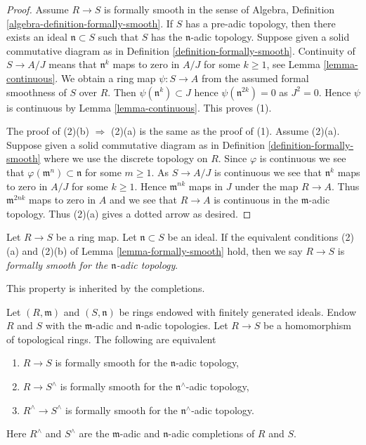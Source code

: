 \begin{proof}
Assume $R \to S$ is formally smooth in
the sense of Algebra, Definition \ref{algebra-definition-formally-smooth}.
If $S$ has a pre-adic topology, then
there exists an ideal $\mathfrak n \subset S$ such that $S$ has the
$\mathfrak n$-adic topology. Suppose given a solid commutative diagram as in
Definition \ref{definition-formally-smooth}.
Continuity of $S \to A/J$ means that $\mathfrak n^k$ maps to zero
in $A/J$ for some $k \geq 1$, see Lemma \ref{lemma-continuous}.
We obtain a ring map $\psi : S \to A$ from the assumed formal smoothness of
$S$ over $R$. Then $\psi(\mathfrak n^k) \subset J$ hence
$\psi(\mathfrak n^{2k}) = 0$ as $J^2 = 0$. Hence $\psi$ is continuous by
Lemma \ref{lemma-continuous}. This proves (1).

\medskip\noindent
The proof of (2)(b) $\Rightarrow$ (2)(a) is the same as the proof of (1).
Assume (2)(a). Suppose given a solid commutative diagram as in
Definition \ref{definition-formally-smooth} where we use the discrete
topology on $R$. Since $\varphi$ is continuous we see that
$\varphi(\mathfrak m^n) \subset \mathfrak n$ for some $m \geq 1$.
As $S \to A/J$ is continuous we see that $\mathfrak n^k$ maps to
zero in $A/J$ for some $k \geq 1$. Hence $\mathfrak m^{nk}$ maps
in $J$ under the map $R \to A$. Thus $\mathfrak m^{2nk}$ maps to zero
in $A$ and we see that $R \to A$ is continuous in the $\mathfrak m$-adic
topology. Thus (2)(a) gives a dotted arrow as desired.
\end{proof}

\begin{definition}
\label{definition-formally-smooth-adic}
Let $R \to S$ be a ring map. Let $\mathfrak n \subset S$ be an
ideal. If the equivalent conditions (2)(a) and (2)(b) of
Lemma \ref{lemma-formally-smooth} hold, then we say
$R \to S$ is {\it formally smooth for the $\mathfrak n$-adic topology}.
\end{definition}

\noindent
This property is inherited by the completions.

\begin{lemma}
\label{lemma-formally-smooth-completion}
Let $(R, \mathfrak m)$ and $(S, \mathfrak n)$ be rings endowed
with finitely generated ideals. Endow $R$ and $S$ with the
$\mathfrak m$-adic and $\mathfrak n$-adic topologies.
Let $R \to S$ be a homomorphism of topological rings.
The following are equivalent
\begin{enumerate}
\item $R \to S$ is formally smooth for the $\mathfrak n$-adic topology,
\item $R \to S^\wedge$ is formally smooth for the $\mathfrak n^\wedge$-adic
topology,
\item $R^\wedge \to S^\wedge$ is formally smooth for the
$\mathfrak n^\wedge$-adic topology.
\end{enumerate}
Here $R^\wedge$ and $S^\wedge$ are the $\mathfrak m$-adic and
$\mathfrak n$-adic completions of $R$ and $S$.
\end{lemma}

